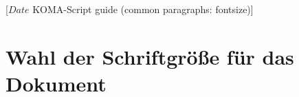 %
%
%
%
%
%
%
%
% 
%
%
%
%

                 [$Date$
                  KOMA-Script guide (common paragraphs: fontsize)]

\section{Wahl der Schriftgröße für das Dokument}
\BeginIndexGroup
{}

